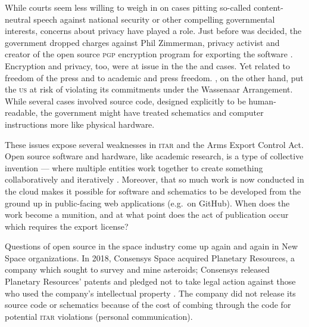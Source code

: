 \documentclass[preprint,twocolumn,5p]{elsarticle}
\begin{document}
While courts seem less willing to weigh in on cases pitting so-called content-neutral speech against national security or other compelling governmental interests, concerns about privacy have played a role. Just before  was decided, the government dropped charges against Phil Zimmerman, privacy activist and creator of the open source \textsc{pgp} encryption program for exporting the software \citep{Markoff1996}. Encryption and privacy, too, were at issue in the the  and  cases. Yet  related to freedom of the press and  to academic and press freedom. , on the other hand, put the \textsc{us} at risk of violating its commitments under the Wassenaar Arrangement. While several cases involved source code, designed explicitly to be human-readable, the government might have treated schematics and computer instructions more like physical hardware.

These issues expose several weaknesses in \textsc{itar} and the Arms Export Control Act. Open source software and hardware, like academic research, is a type of collective invention --- where multiple entities work together to create something collaboratively and iteratively \citep{Allen1983,Schrape2019}. Moreover, that so much work is now conducted in the cloud makes it possible for software and schematics to be developed from the ground up in public-facing web applications (e.g.\ on GitHub). When does the work become a munition, and at what point does the act of publication occur which requires the export license?

Questions of open source in the space industry come up again and again in New Space organizations. In 2018, Consensys Space acquired Planetary Resources, a company which sought to survey and mine asteroids; Consensys released Planetary Resources' patents and pledged not to take legal action against those who used the company's intellectual property \citep{Consensys2018}. The company did not release its source code or schematics because of the cost of combing through the code for potential \textsc{itar} violations (personal communication).
\end{document}

